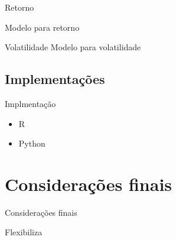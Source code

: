 \documentclass{beamer}
\begin{document}
\begin{frame}{Retorno}

Modelo para retorno
\end{frame}


\begin{frame}{Volatilidade}
Modelo para volatilidade
\end{frame}





\subsection{Implementações}

\begin{frame}{Implmentação}

\begin{itemize}

\item R

\item Python


\end{itemize}

\end{frame}



\section{Considerações finais}
\begin{frame}{Considerações finais}

Flexibiliza

\end{frame}



\begin{frame}[allowframebreaks]%
    {\tiny
    
    
    }
\end{frame}
\end{document}
